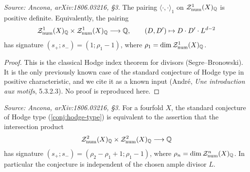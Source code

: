 \begin{theorem}
  \label{thm:segre}
  \textit{Source: Ancona, arXiv:1806.03216, §3.}
  The pairing \(\langle \cdot, \cdot \rangle_{1}\) on
  \(\mathcal{Z}_{\mathrm{num}}^{1}(X)_{\mathbb{Q}}\) is positive definite. Equivalently, the
  pairing
  \[\mathcal{Z}^1_{\mathrm{num}}(X)_{\mathbb{Q}} \times \mathcal{Z}_{\mathrm{num}}^1(X)_{\mathbb{Q}}
    \longrightarrow \mathbb{Q}, \qquad (D, D') \mapsto D \cdot D' \cdot L^{d-2}\]
  has signature \((s_+; s_-) = (1; \rho_1 - 1)\), where
  \(\rho_1 = \dim \mathcal{Z}_{\mathrm{num}}^1(X)_{\mathbb{Q}}\).
\end{theorem}

\begin{proof}
  This is the classical Hodge index theorem for divisors (Segre--Bronowski). It
  is the only previously known case of the standard conjecture of Hodge type in
  positive characteristic, and we cite it as a known input (André,
  \emph{Une introduction aux motifs}, 5.3.2.3). No proof is reproduced here.
\end{proof}

\begin{proposition}
  \label{prop:any-polarization}
  \textit{Source: Ancona, arXiv:1806.03216, §3.}
  For a fourfold \(X\), the standard conjecture of Hodge type
  (\cref{conj:hodge-type}) is equivalent to the assertion that the intersection
  product
  \[\mathcal{Z}^2_{\mathrm{num}}(X)_{\mathbb{Q}} \times \mathcal{Z}_{\mathrm{num}}^2(X)_{\mathbb{Q}}
    \longrightarrow \mathbb{Q}\]
  has signature \((s_+; s_-) = (\rho_2 - \rho_1 + 1; \rho_1 - 1)\), where
  \(\rho_n = \dim \mathcal{Z}_{\mathrm{num}}^n(X)_{\mathbb{Q}}\). In particular the conjecture is
  independent of the chosen ample divisor \(L\).
\end{proposition}


